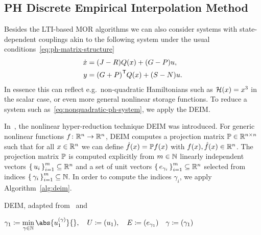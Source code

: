 \subsection{\texorpdfstring{\ac{PH}}{PH} Discrete Empirical Interpolation Method}\label{subsec:ph-deim}

Besides the \ac{LTI}-based \ac{MOR} algorithms we can also consider systems with state-dependent couplings akin to the following system under the usual conditions~\eqref{eq:ph-matrix-structure}
\begin{equation}\label{eq:nonquadratic-ph-system}
    \begin{aligned}
        \dot{x} &= (J - R) Q(x) + (G - P) u, \\
        y &= {(G + P)}^{\mkern1mu \mathsf{T}} Q(x) + (S - N) u.
    \end{aligned}
\end{equation}
In essence this can reflect e.g.\ non-quadratic Hamiltonians such as $\mathcal{H}(x) = x^3$ in the scalar case, or even more general nonlinear storage functions.
To reduce a system such as~\eqref{eq:nonquadratic-ph-system}, we apply the \acf{DEIM}.

In~\cite{Chaturantabut2010}, the nonlinear hyper-reduction technique \ac{DEIM} was introduced.
For generic nonlinear functions $f \colon \mathbb{R}^n \to \mathbb{R}^n$, \ac{DEIM} computes a projection matrix $\mathbb{P} \in \mathbb{R}^{n \times n}$ such that for all $x \in \mathbb{R}^n$ we can define $\hat{f}(x) = \mathbb{P} f(x)$ with $f(x), \hat{f}(x) \in \mathbb{R}^n$.
The projection matrix $\mathbb{P}$ is computed explicitly from $m \in \mathbb{N}$ linearly independent vectors ${\left\{\,u_i\,\right\}}_{i = 1}^m \subseteq \mathbb{R}^n$ and a set of unit vectors ${\left\{\,e_{\gamma_i}\,\right\}}_{i = 1}^m \subseteq \mathbb{R}^n$ selected from indices ${\left\{\,\gamma_i\,\right\}}_{i = 1}^m \subseteq \mathbb{N}$.
In order to compute the indices $\gamma_i$, we apply Algorithm~\ref{alg:deim}.

\begin{algorithm}\label{alg:deim}
    \caption{\ac{DEIM}, adapted from~\cite[Algorithm~1]{Chaturantabut2010} and~\cite[Algorithm~4]{Chaturantabut2016}}
    $\gamma_1 \coloneqq \min\limits_{\gamma \in \bb{N}}{\abs{u_1^{(\gamma)}}{}},\quad U \coloneqq (u_1),\quad E \coloneqq (e_{\gamma_1})\quad \gamma \coloneqq (\gamma_1)$\;
\end{algorithm}

